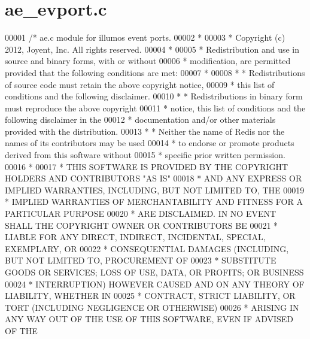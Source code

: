\hypertarget{ae__evport_8c_source}{}\section{ae\+\_\+evport.\+c}
\label{ae__evport_8c_source}

\begin{DoxyCode}
00001 \textcolor{comment}{/* ae.c module for illumos event ports.}
00002 \textcolor{comment}{ *}
00003 \textcolor{comment}{ * Copyright (c) 2012, Joyent, Inc. All rights reserved.}
00004 \textcolor{comment}{ *}
00005 \textcolor{comment}{ * Redistribution and use in source and binary forms, with or without}
00006 \textcolor{comment}{ * modification, are permitted provided that the following conditions are met:}
00007 \textcolor{comment}{ *}
00008 \textcolor{comment}{ *   * Redistributions of source code must retain the above copyright notice,}
00009 \textcolor{comment}{ *     this list of conditions and the following disclaimer.}
00010 \textcolor{comment}{ *   * Redistributions in binary form must reproduce the above copyright}
00011 \textcolor{comment}{ *     notice, this list of conditions and the following disclaimer in the}
00012 \textcolor{comment}{ *     documentation and/or other materials provided with the distribution.}
00013 \textcolor{comment}{ *   * Neither the name of Redis nor the names of its contributors may be used}
00014 \textcolor{comment}{ *     to endorse or promote products derived from this software without}
00015 \textcolor{comment}{ *     specific prior written permission.}
00016 \textcolor{comment}{ *}
00017 \textcolor{comment}{ * THIS SOFTWARE IS PROVIDED BY THE COPYRIGHT HOLDERS AND CONTRIBUTORS "AS IS"}
00018 \textcolor{comment}{ * AND ANY EXPRESS OR IMPLIED WARRANTIES, INCLUDING, BUT NOT LIMITED TO, THE}
00019 \textcolor{comment}{ * IMPLIED WARRANTIES OF MERCHANTABILITY AND FITNESS FOR A PARTICULAR PURPOSE}
00020 \textcolor{comment}{ * ARE DISCLAIMED. IN NO EVENT SHALL THE COPYRIGHT OWNER OR CONTRIBUTORS BE}
00021 \textcolor{comment}{ * LIABLE FOR ANY DIRECT, INDIRECT, INCIDENTAL, SPECIAL, EXEMPLARY, OR}
00022 \textcolor{comment}{ * CONSEQUENTIAL DAMAGES (INCLUDING, BUT NOT LIMITED TO, PROCUREMENT OF}
00023 \textcolor{comment}{ * SUBSTITUTE GOODS OR SERVICES; LOSS OF USE, DATA, OR PROFITS; OR BUSINESS}
00024 \textcolor{comment}{ * INTERRUPTION) HOWEVER CAUSED AND ON ANY THEORY OF LIABILITY, WHETHER IN}
00025 \textcolor{comment}{ * CONTRACT, STRICT LIABILITY, OR TORT (INCLUDING NEGLIGENCE OR OTHERWISE)}
00026 \textcolor{comment}{ * ARISING IN ANY WAY OUT OF THE USE OF THIS SOFTWARE, EVEN IF ADVISED OF THE}

\end{DoxyCode}
